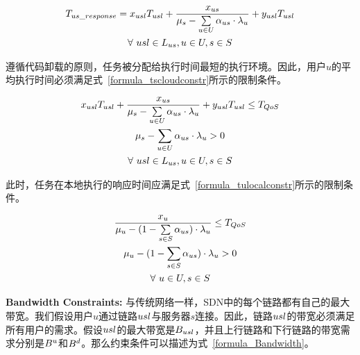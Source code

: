 \begin{equation}
\label{formula_Tusresponse}
\begin{gathered}
{T}_{us\_response} = x_{usl} T_{usl} + \frac{{x}_{us}}{{\mu}_{s}-\sum\limits_{u \in U}{\alpha}_{us} \cdot {\lambda}_{u}} + y_{usl} T_{usl}\\
\forall \ usl\in L_{us}, u\in U, s\in S\\
\end{gathered}
\end{equation}

遵循代码卸载的原则，任务被分配给执行时间最短的执行环境。因此，用户$u$的平均执行时间必须满足式~\eqref{formula_tscloudconstr}所示的限制条件。

\begin{equation}
\label{formula_tscloudconstr}
\begin{gathered}
x_{usl} T_{usl} + \frac{{x}_{us}}{{\mu}_{s}-\sum\limits_{u \in U}{\alpha}_{us} \cdot {\lambda}_{u}} + y_{usl} T_{usl} \leq T_{QoS}\\
{\mu}_{s}-\sum\limits_{u \in U}{\alpha}_{us} \cdot {\lambda}_{u} > 0\\
\forall \ usl\in L_{us}, u\in U, s\in S\\
\end{gathered}
\end{equation}

此时，任务在本地执行的响应时间应满足式~\eqref{formula_tulocalconstr}所示的限制条件。

\begin{equation}
\label{formula_tulocalconstr}
\begin{gathered}
\frac{{x}_{u}}{{\mu}_{u} - (1 - \sum\limits_{s \in S} {\alpha}_{us}) \cdot {\lambda}_{u}} \leq T_{QoS}\\
{\mu}_{u} - (1 - \sum\limits_{s \in S}{\alpha}_{us}) \cdot {\lambda}_{u} > 0\\
\forall \ u\in U, s\in S\\
\end{gathered}
\end{equation}

\textbf{Bandwidth Constraints:}
与传统网络一样，SDN中的每个链路都有自己的最大带宽。我们假设用户$u$通过链路$usl$与服务器$s$连接。因此，链路$usl$的带宽必须满足所有用户的需求。假设$usl$的最大带宽是$B_{usl}$，并且上行链路和下行链路的带宽需求分别是$B^{u}$和$B^{d}$。那么约束条件可以描述为式~\eqref{formula_Bandwidth}。


